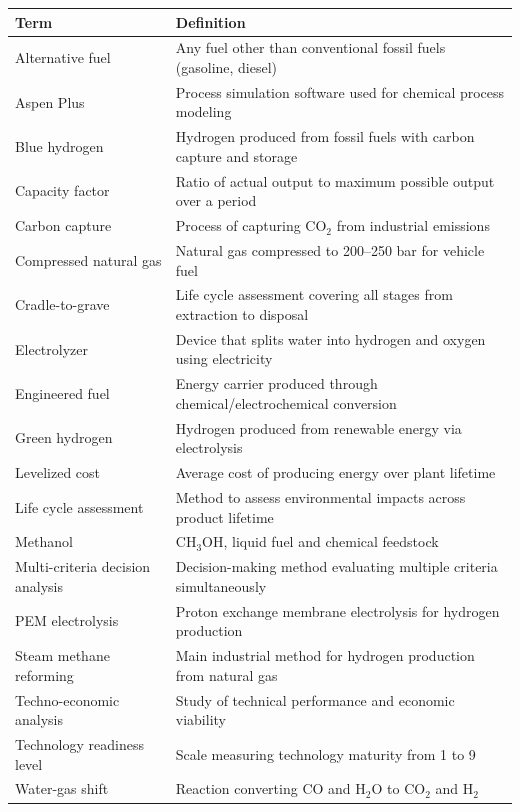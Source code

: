 \documentclass[12pt,twoside,openany]{book}
\begin{document}
\begin{longtable}{L{3.5cm} L{10cm}}
\hline
\textbf{Term} & \textbf{Definition} \\
\hline
\endhead
Alternative fuel & Any fuel other than conventional fossil fuels (gasoline, diesel) \\
Aspen Plus & Process simulation software used for chemical process modeling \\
Blue hydrogen & Hydrogen produced from fossil fuels with carbon capture and storage \\
Capacity factor & Ratio of actual output to maximum possible output over a period \\
Carbon capture & Process of capturing CO$_2$ from industrial emissions \\
Compressed natural gas & Natural gas compressed to 200--250 bar for vehicle fuel \\
Cradle-to-grave & Life cycle assessment covering all stages from extraction to disposal \\
Electrolyzer & Device that splits water into hydrogen and oxygen using electricity \\
Engineered fuel & Energy carrier produced through chemical/electrochemical conversion \\
Green hydrogen & Hydrogen produced from renewable energy via electrolysis \\
Levelized cost & Average cost of producing energy over plant lifetime \\
Life cycle assessment & Method to assess environmental impacts across product lifetime \\
Methanol & CH$_3$OH, liquid fuel and chemical feedstock \\
Multi-criteria decision analysis & Decision-making method evaluating multiple criteria simultaneously \\
PEM electrolysis & Proton exchange membrane electrolysis for hydrogen production \\
Steam methane reforming & Main industrial method for hydrogen production from natural gas \\
Techno-economic analysis & Study of technical performance and economic viability \\
Technology readiness level & Scale measuring technology maturity from 1 to 9 \\
Water-gas shift & Reaction converting CO and H$_2$O to CO$_2$ and H$_2$ \\
\hline
\end{longtable}
\end{document}
